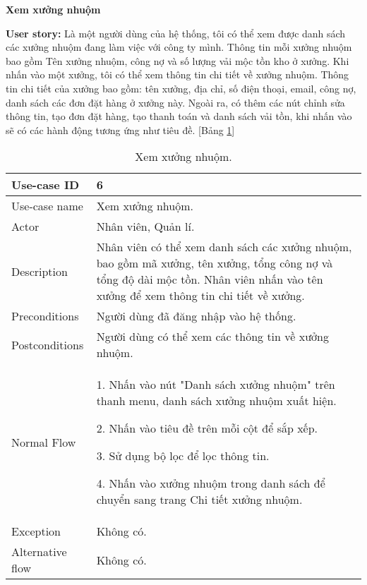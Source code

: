 \textbf{Xem xưởng nhuộm}\par
\textbf{User story:} Là một người dùng của hệ thống, tôi có thể xem được danh sách các xưởng nhuộm đang làm việc với công ty mình. Thông tin mỗi xưởng nhuộm bao gồm Tên xưởng nhuộm, công nợ và số lượng vải mộc tồn kho ở xưởng. Khi nhấn vào một xưởng, tôi có thể xem thông tin chi tiết về xưởng nhuộm. Thông tin chi tiết của xưởng bao gồm: tên xưởng, địa chỉ, số điện thoại, email, công nợ, danh sách các đơn đặt hàng ở xưởng này. Ngoài ra, có thêm các nút chỉnh sửa thông tin, tạo đơn đặt hàng, tạo thanh toán và danh sách vải tồn, khi nhấn vào sẽ có các hành động tương ứng như tiêu đề. [Bảng \ref{bang3}]
\begin{table}[H]
    \centering
    \begin{tabular}{|m{3cm}|m{10cm}|}
    \hline 
        Use-case ID & 6\\ \hline
        Use-case name & Xem xưởng nhuộm.\\ \hline
        Actor & Nhân viên, Quản lí.\\ \hline
        Description & Nhân viên có thể xem danh sách các xưởng nhuộm, bao gồm mã xưởng, tên xưởng, tổng công nợ và tổng độ dài mộc tồn. Nhân viên nhấn vào tên xưởng để xem thông tin chi tiết về xưởng.\\ \hline
        Preconditions & Người dùng đã đăng nhập vào hệ thống.\\ \hline
        Postconditions & Người dùng có thể xem các thông tin về xưởng nhuộm.\\ \hline
        Normal Flow & 
        1. Nhấn vào nút "Danh sách xưởng nhuộm" trên thanh menu, danh sách xưởng nhuộm xuất hiện.\par
        2. Nhấn vào tiêu đề trên mỗi cột để sắp xếp.\par
        3. Sử dụng bộ lọc để lọc thông tin.\par
        4. Nhấn vào xưởng nhuộm trong danh sách để chuyển sang trang Chi tiết xưởng nhuộm.\par
        \\ \hline
        Exception & Không có.\\ \hline
        Alternative flow & 
        Không có. \par
        \\ 
    \hline 
    \end{tabular}
    \caption{Xem xưởng nhuộm.}
    \label{bang3}
\end{table}


